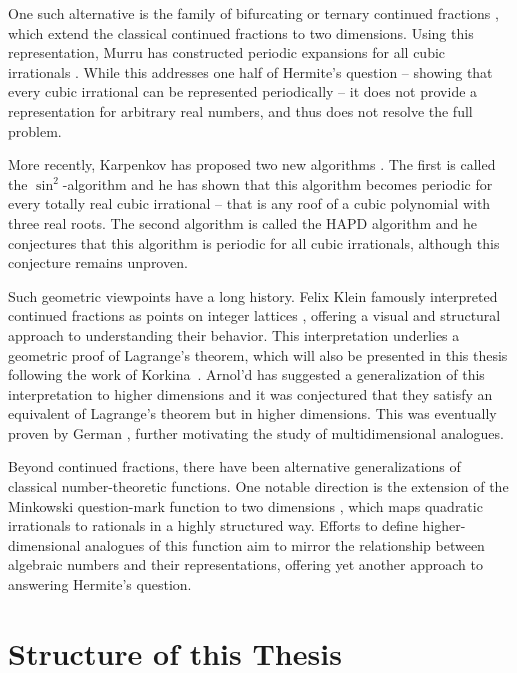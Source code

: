 One such alternative is the family of bifurcating or ternary continued
fractions \cite{Gupta00},
which extend the classical continued fractions to two dimensions.
Using this representation, Murru has constructed periodic expansions for all
cubic irrationals \cite{Murru15}.
While this addresses one half of Hermite’s question --
showing that every cubic irrational can be represented periodically --
it does not provide a representation for arbitrary real numbers,
and thus does not resolve the full problem.

More recently, Karpenkov has proposed two new algorithms \cite{Karpenkov21, Karpenkov24}.
The first is called the $\sin^2$-algorithm and he has shown that this algorithm
becomes periodic for every totally real cubic irrational -- that is any roof of
a cubic polynomial with three real roots.
The second algorithm is called the HAPD algorithm \cite{Karpenkov24} and he
conjectures that this algorithm is periodic for all cubic irrationals,
although this conjecture remains unproven.

Such geometric viewpoints have a long history.
Felix Klein famously interpreted continued fractions as points on integer
lattices \cite{Klein95}, offering a visual and structural approach to
understanding their behavior.
This interpretation underlies a geometric proof of Lagrange’s theorem, which
will also be presented in this thesis following the work of
Korkina~\cite{Korkina96}.
Arnol'd has suggested a generalization of this interpretation to higher
dimensions \cite{Arnold98} and it was conjectured that they satisfy an
equivalent of Lagrange's theorem but in higher dimensions.
This was eventually proven by German \cite{German08}, further motivating the
study of multidimensional analogues.

Beyond continued fractions, there have been alternative
generalizations of classical number-theoretic functions.
One notable direction is the extension of the Minkowski question-mark function
to two dimensions \cite{Beaver04}, which maps quadratic irrationals to rationals in a highly structured way.
Efforts to define higher-dimensional analogues of this function aim to mirror
the relationship between algebraic numbers and their representations,
offering yet another approach to answering Hermite’s question.

\section{Structure of this Thesis}

